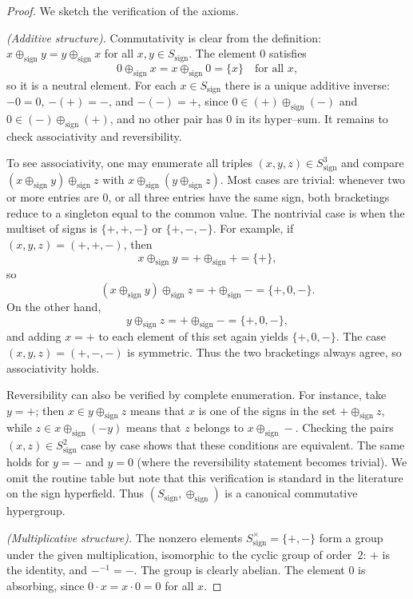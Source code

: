 \documentclass[11pt]{amsart}
\numberwithin{equation}{section}
\theoremstyle{definition}
\theoremstyle{remark}
\begin{document}
\begin{proof}
We sketch the verification of the axioms.

\smallskip\noindent
\emph{(Additive structure).}  Commutativity is clear from the
definition: $x\oplus_{\mathrm{sign}}y=y\oplus_{\mathrm{sign}}x$ for
all $x,y\in S_{\mathrm{sign}}$.  The element $0$ satisfies
\[
  0\oplus_{\mathrm{sign}}x
  = x\oplus_{\mathrm{sign}}0
  = \{x\}
  \quad\text{for all }x,
\]
so it is a neutral element.  For each $x\in S_{\mathrm{sign}}$ there
is a unique additive inverse: $-0=0$, $-(+)= -$, and $-(-)=+$, since
$0\in(+)\oplus_{\mathrm{sign}}(-)$ and $0\in(-)\oplus_{\mathrm{sign}}(+)$,
and no other pair has $0$ in its hyper–sum.  It remains to check
associativity and reversibility.

To see associativity, one may enumerate all triples
$(x,y,z)\in S_{\mathrm{sign}}^3$ and compare
$(x\oplus_{\mathrm{sign}}y)\oplus_{\mathrm{sign}}z$ with
$x\oplus_{\mathrm{sign}}(y\oplus_{\mathrm{sign}}z)$.  Most cases are
trivial: whenever two or more entries are $0$, or all three entries
have the same sign, both bracketings reduce to a singleton equal to the
common value.  The nontrivial case is when the multiset of signs is
$\{+,+,-\}$ or $\{+,-,-\}$.  For example, if $(x,y,z)=(+,+,-)$, then
\[
  x\oplus_{\mathrm{sign}}y = +\oplus_{\mathrm{sign}}+
  = \{+\},
\]
so
\[
  (x\oplus_{\mathrm{sign}}y)\oplus_{\mathrm{sign}}z
  = +\oplus_{\mathrm{sign}}-
  = \{+,0,-\}.
\]
On the other hand,
\[
  y\oplus_{\mathrm{sign}}z
  = +\oplus_{\mathrm{sign}}-
  = \{+,0,-\},
\]
and adding $x=+$ to each element of this set again yields
$\{+,0,-\}$.  The case $(x,y,z)=(+,-,-)$ is symmetric.  Thus the two
bracketings always agree, so associativity holds.

Reversibility can also be verified by complete enumeration.  For
instance, take $y=+$; then $x\in y\oplus_{\mathrm{sign}}z$ means that
$x$ is one of the signs in the set $+\oplus_{\mathrm{sign}}z$, while
$z\in x\oplus_{\mathrm{sign}}(-y)$ means that $z$ belongs to
$x\oplus_{\mathrm{sign}}-$.  Checking the pairs
$(x,z)\in S_{\mathrm{sign}}^2$ case by case shows that these conditions
are equivalent.  The same holds for $y=-$ and $y=0$ (where the
reversibility statement becomes trivial).  We omit the routine table
but note that this verification is standard in the literature on the
sign hyperfield.  Thus $(S_{\mathrm{sign}},\oplus_{\mathrm{sign}})$ is a
canonical commutative hypergroup.

\smallskip\noindent
\emph{(Multiplicative structure).}  The nonzero elements
$S_{\mathrm{sign}}^\times = \{+,-\}$ form a group under the given
multiplication, isomorphic to the cyclic group of order~$2$:
$+$ is the identity, and $-^{-1}=-$.  The group is clearly abelian.
The element $0$ is absorbing, since $0\cdot x=x\cdot 0=0$ for all $x$.


\end{proof}
\end{document}
